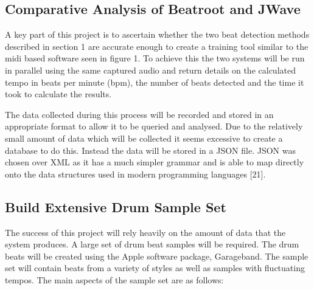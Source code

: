 \documentclass[a4paper, 11pt]{article}
\begin{document}
\subsection{Comparative Analysis of Beatroot and JWave}
A key part of this project is to ascertain whether the two beat detection methods described in section 1 are accurate enough to create a training tool similar to the midi based software seen in figure 1. To achieve this the two systems will be run in parallel using the same captured audio and return details on the calculated tempo in beats per minute (bpm), the number of beats detected and the time it took to calculate the results. 

The data collected during this process will be recorded and stored in an appropriate format to allow it to be queried and analysed. Due to the relatively small amount of data which will be collected it seems excessive to create a database to do this. Instead the data will be stored in a JSON file. JSON was chosen over XML as it has a much simpler grammar and is able to map directly onto the data structures used in modern programming languages [21].

\subsection{Build Extensive Drum Sample Set}
The success of this project will rely heavily on the amount of data that the system produces. A large set of drum beat samples will be required. The drum beats will be created using the Apple software package, Garageband. The sample set will contain beats from a variety of styles as well as samples with fluctuating tempos. The main aspects of the sample set are as follows:
\end{document}

